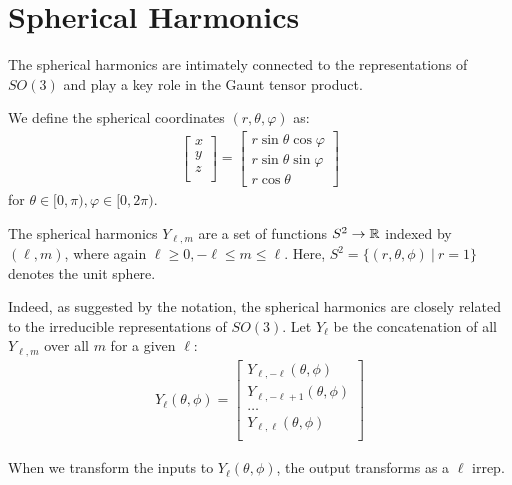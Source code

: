 \section{Spherical Harmonics}
\label{sec:spherical_harmonics}
The spherical harmonics are intimately connected to the representations of $SO(3)$ and play a key role in the Gaunt tensor product.

We define the spherical coordinates $(r, \theta, \varphi)$ as:
\begin{align}
\begin{bmatrix}
    x \\
    y \\
    z \\
\end{bmatrix} = \begin{bmatrix}
r \sin \theta \cos \varphi \\ r \sin \theta \sin \varphi \\ r \cos \theta 
\end{bmatrix}
\end{align}
for $\theta \in [0, \pi), \varphi \in [0, 2\pi)$.

The spherical harmonics $Y_{\ell, m}$ are a set of functions $S^2 \rightarrow \mathbb{R}$ indexed by $(\ell, m)$, where again $\ell \geq 0, -\ell \leq m \leq \ell$. Here, $S^2 = \{(r, \theta, \phi) \ | \ r = 1\}$ denotes the unit sphere. 

Indeed, as suggested by the notation, the spherical harmonics are closely related to the irreducible representations of $SO(3)$.
Let $Y_\ell$ be the concatenation of all $Y_{\ell, m}$ over all $m$ for a given $\ell$:
\begin{align}
    Y_\ell(\theta, \phi) = \begin{bmatrix}
        Y_{\ell, -\ell}(\theta, \phi) \\
        Y_{\ell, -\ell + 1}(\theta, \phi) \\
        \ldots \\
        Y_{\ell, \ell}(\theta, \phi) \\
    \end{bmatrix}    
\end{align}

When we transform the inputs to $Y_\ell(\theta, \phi)$, the output transforms as a $\ell$ irrep.

